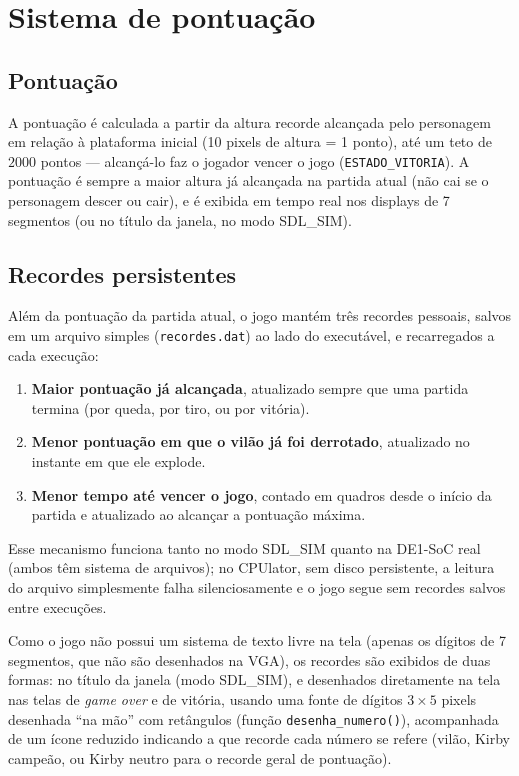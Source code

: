 \documentclass[a4paper,12pt]{article}
\newcommand{\code}[1]{\texttt{#1}}
\begin{document}
\section{Sistema de pontuação}
\label{sec:pontuacao}

\subsection{Pontuação}

A pontuação é calculada a partir da altura recorde alcançada pelo personagem
em relação à plataforma inicial (10 pixels de altura = 1 ponto), até um teto
de $2000$ pontos --- alcançá-lo faz o jogador vencer o jogo (\code{ESTADO\_VITORIA}).
A pontuação é sempre a maior altura já alcançada na partida atual (não cai se
o personagem descer ou cair), e é exibida em tempo real nos displays de 7
segmentos (ou no título da janela, no modo SDL\_SIM).

\subsection{Recordes persistentes}

Além da pontuação da partida atual, o jogo mantém três recordes pessoais,
salvos em um arquivo simples (\code{recordes.dat}) ao lado do executável, e
recarregados a cada execução:

\begin{enumerate}
    \item \textbf{Maior pontuação já alcançada}, atualizado sempre que uma
    partida termina (por queda, por tiro, ou por vitória).
    \item \textbf{Menor pontuação em que o vilão já foi derrotado}, atualizado
    no instante em que ele explode.
    \item \textbf{Menor tempo até vencer o jogo}, contado em quadros desde o
    início da partida e atualizado ao alcançar a pontuação máxima.
\end{enumerate}

Esse mecanismo funciona tanto no modo SDL\_SIM quanto na DE1-SoC real (ambos
têm sistema de arquivos); no CPUlator, sem disco persistente, a leitura do
arquivo simplesmente falha silenciosamente e o jogo segue sem recordes
salvos entre execuções.

Como o jogo não possui um sistema de texto livre na tela (apenas os dígitos
de 7 segmentos, que não são desenhados na VGA), os recordes são exibidos de
duas formas: no título da janela (modo SDL\_SIM), e desenhados diretamente na
tela nas telas de \emph{game over} e de vitória, usando uma fonte de dígitos
$3\times5$ pixels desenhada ``na mão'' com retângulos (função
\code{desenha\_numero()}), acompanhada de um ícone reduzido indicando a que
recorde cada número se refere (vilão, Kirby campeão, ou Kirby neutro para o
recorde geral de pontuação).
\end{document}
